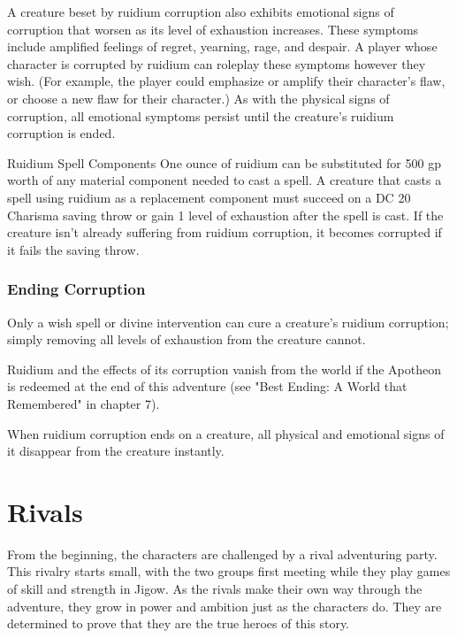 \documentclass[10pt,a4paper,twoside,bg=print,twocolumn,openany,nodeprecatedcode]{dndbook}
\begin{document}
A creature beset by ruidium corruption also exhibits emotional signs of corruption that worsen as its level of exhaustion increases. These symptoms include amplified feelings of regret, yearning, rage, and despair. A player whose character is corrupted by ruidium can roleplay these symptoms however they wish. (For example, the player could emphasize or amplify their character's flaw, or choose a new flaw for their character.) As with the physical signs of corruption, all emotional symptoms persist until the creature's ruidium corruption is ended.

\begin{DndSidebar}[float=!b]{Ruidium Spell Components}
One ounce of ruidium can be substituted for 500 gp worth of any material component needed to cast a spell. A creature that casts a spell using ruidium as a replacement component must succeed on a DC 20 Charisma saving throw or gain 1 level of exhaustion after the spell is cast. If the creature isn't already suffering from ruidium corruption, it becomes corrupted if it fails the saving throw.



\end{DndSidebar}

\subsubsection{Ending Corruption}
Only a wish spell or divine intervention can cure a creature's ruidium corruption; simply removing all levels of exhaustion from the creature cannot.

Ruidium and the effects of its corruption vanish from the world if the Apotheon is redeemed at the end of this adventure (see "Best Ending: A World that Remembered" in chapter 7).

When ruidium corruption ends on a creature, all physical and emotional signs of it disappear from the creature instantly.

\section{Rivals}
From the beginning, the characters are challenged by a rival adventuring party. This rivalry starts small, with the two groups first meeting while they play games of skill and strength in Jigow. As the rivals make their own way through the adventure, they grow in power and ambition just as the characters do. They are determined to prove that they are the true heroes of this story.
\end{document}
